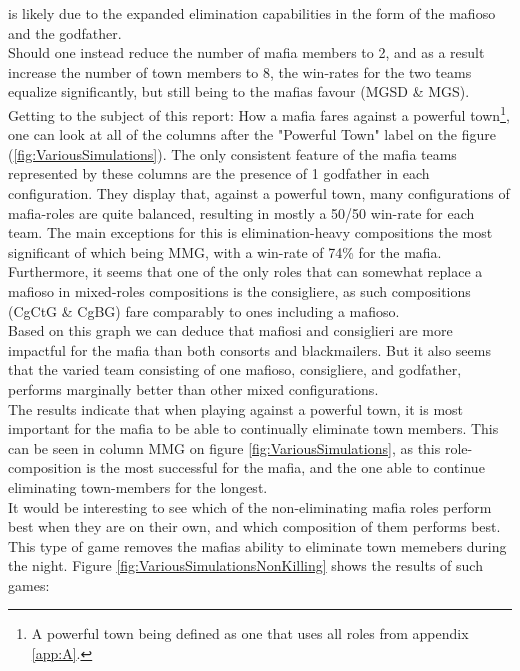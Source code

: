 is likely due to the expanded elimination capabilities in the form of the
mafioso and the godfather. \\ Should one instead reduce the number of mafia
members to 2, and as a result increase the number of town members to 8, the
win-rates for the two teams equalize significantly, but still being to the
mafias favour (MGSD \& MGS).\\ Getting to the subject of this report: How a
mafia fares against a powerful town\footnote{A powerful town being defined as
    one that uses all roles from appendix \ref{app:A}.}, one can look at all of the
columns after the "Powerful Town" label on the figure
(\ref{fig:VariousSimulations}). The only consistent feature of the mafia teams
represented by these columns are the presence of 1 godfather in each
configuration. They display that, against a powerful town, many configurations
of mafia-roles are quite balanced, resulting in mostly a 50/50 win-rate for
each team. The main exceptions for this is elimination-heavy compositions the
most significant of which being MMG, with a win-rate of 74\% for the mafia.
Furthermore, it seems that one of the only roles that can somewhat replace a
mafioso in mixed-roles compositions is the consigliere, as such compositions
(CgCtG \& CgBG) fare comparably to ones including a mafioso. \\
Based on this graph we can deduce that mafiosi and
consiglieri are more
impactful for the mafia than both consorts and blackmailers. But it also seems
that the varied team consisting of one mafioso, consigliere, and godfather,
performs marginally better than other mixed configurations. \\
The results indicate that when playing
against a powerful town, it is most
important for the mafia to be able to
continually eliminate town members. This can
be seen in column MMG on figure
\ref{fig:VariousSimulations}, as this
role-composition is the most successful for
the mafia, and the one able to continue
eliminating town-members for the longest.\\
It would be interesting to see which of the non-eliminating mafia roles perform
best when they are on their own, and which composition of them performs best.
This type of game removes the mafias ability to eliminate town memebers during the night.
Figure \ref{fig:VariousSimulationsNonKilling} shows the results of such games:
